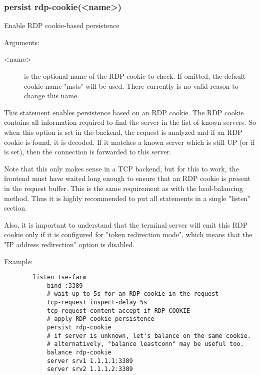 \subsubsection*{persist rdp-cookie(<name>)}

  Enable RDP cookie-based persistence


  Arguments:
  \begin{description}
  \item[<name>] is the optional name of the RDP cookie to check. If omitted, the
              default cookie name "msts" will be used. There currently is no
              valid reason to change this name.
  \end{description}

  This statement enables persistence based on an RDP cookie. The RDP cookie
  contains all information required to find the server in the list of known
  servers. So when this option is set in the backend, the request is analyzed
  and if an RDP cookie is found, it is decoded. If it matches a known server
  which is still UP (or if  is set), then the connection is
  forwarded to this server.

  Note that this only makes sense in a TCP backend, but for this to work, the
  frontend must have waited long enough to ensure that an RDP cookie is present
  in the request buffer. This is the same requirement as with the 
  load-balancing method. Thus it is highly recommended to put all statements in
  a single "listen" section.

  Also, it is important to understand that the terminal server will emit this
  RDP cookie only if it is configured for "token redirection mode", which means
  that the "IP address redirection" option is disabled.

  Example:
  \begin{verbatim}
        listen tse-farm
            bind :3389
            # wait up to 5s for an RDP cookie in the request
            tcp-request inspect-delay 5s
            tcp-request content accept if RDP_COOKIE
            # apply RDP cookie persistence
            persist rdp-cookie
            # if server is unknown, let's balance on the same cookie.
            # alternatively, "balance leastconn" may be useful too.
            balance rdp-cookie
            server srv1 1.1.1.1:3389
            server srv2 1.1.1.2:3389
  \end{verbatim}


